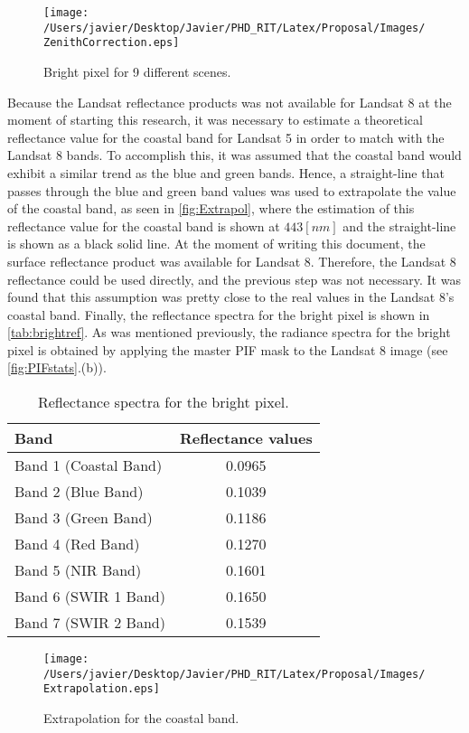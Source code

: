 \begin{figure}[htb]
  	\centering
  	\texttt{[image: /Users/javier/Desktop/Javier/PHD\_RIT/Latex/Proposal/Images/ZenithCorrection.eps]}
  \caption{Bright pixel for 9 different scenes. \label{fig:ZenithCorr} } 
\end{figure}
Because the Landsat reflectance products was not available for Landsat 8 at the moment of starting this research, it was necessary to estimate a theoretical reflectance value for the coastal band for Landsat 5 in order to match with the Landsat 8 bands. To accomplish this, it was assumed that the coastal band would exhibit a similar trend as the blue and green bands. Hence, a straight-line that passes through the blue and green band values was used to extrapolate the value of the coastal band, as seen in \autoref{fig:Extrapol}, where the estimation of this reflectance value for the coastal band is shown at $443 [nm]$ and the straight-line is shown as a black solid line. At the moment of writing this document, the surface reflectance product was available for Landsat 8. Therefore, the Landsat 8 reflectance could be used directly, and the previous step was not necessary. It was found that this assumption was pretty close to the real values in the Landsat 8's coastal band. Finally, the reflectance spectra for the bright pixel is shown in \autoref{tab:brightref}. As was mentioned previously, the radiance spectra for the bright pixel is obtained by applying the master PIF mask to the Landsat 8 image (see \autoref{fig:PIFstats}.(b)).

\begin{table}[htb]
\caption{ Reflectance spectra for the bright pixel. \label{tab:brightref} } 
\centering
\begin{tabular}{l|c} 
 \bfseries{Band} & \bfseries{Reflectance values}\\ \hline \hline
 Band 1 (Coastal Band) &  0.0965 \\
 Band 2 (Blue Band) &  0.1039 \\
 Band 3 (Green Band) &  0.1186 \\
 Band 4 (Red Band) &  0.1270 \\
 Band 5 (NIR Band) &  0.1601 \\
 Band 6 (SWIR 1 Band) &  0.1650 \\ 
 Band 7 (SWIR 2 Band) &  0.1539 \\ 
 \end{tabular}
\end{table}

\begin{figure}[htb]
  	\centering
  	\texttt{[image: /Users/javier/Desktop/Javier/PHD\_RIT/Latex/Proposal/Images/Extrapolation.eps]}
  \caption{Extrapolation for the coastal band. \label{fig:Extrapol} } 
\end{figure}

